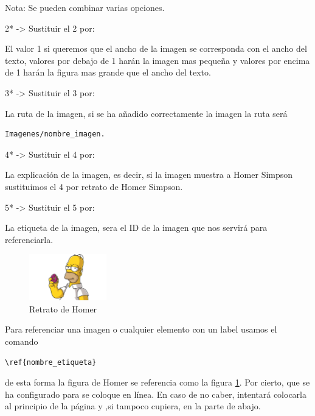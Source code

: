 Nota: Se pueden combinar varias opciones.

2* -> Sustituir el 2 por:

El valor 1 si queremos que el ancho de la imagen se corresponda con el ancho del texto, valores por debajo de 1 harán la imagen mas pequeña y valores por encima de 1 harán la figura mas grande que el ancho del texto.

3* -> Sustituir el 3 por:

La ruta de la imagen, si se ha añadido correctamente la imagen la ruta será \begin{verbatim}
Imagenes/nombre_imagen.
\end{verbatim}
4* -> Sustituir el 4 por:

La explicación de la imagen, es decir, si la imagen muestra a Homer Simpson sustituimos el 4 por retrato de Homer Simpson.

5* -> Sustituir el 5 por:

La etiqueta de la imagen, sera el ID de la imagen que nos servirá para referenciarla.
\begin{figure}[!htb]
	\centering
   \includegraphics[width=0.3\textwidth]{Imagenes/homer.jpg}
  \caption{Retrato de Homer}
  \label{fig:Homer}
\end{figure}

Para referenciar una imagen o cualquier elemento con un label usamos el comando \begin{verbatim}\ref{nombre_etiqueta}\end{verbatim} de esta forma la figura de Homer se referencia como la figura \ref{fig:Homer}. Por cierto, que se ha configurado para se coloque en línea. En caso de no caber, intentará colocarla al principio de la página y ,si tampoco cupiera, en la parte de abajo.




